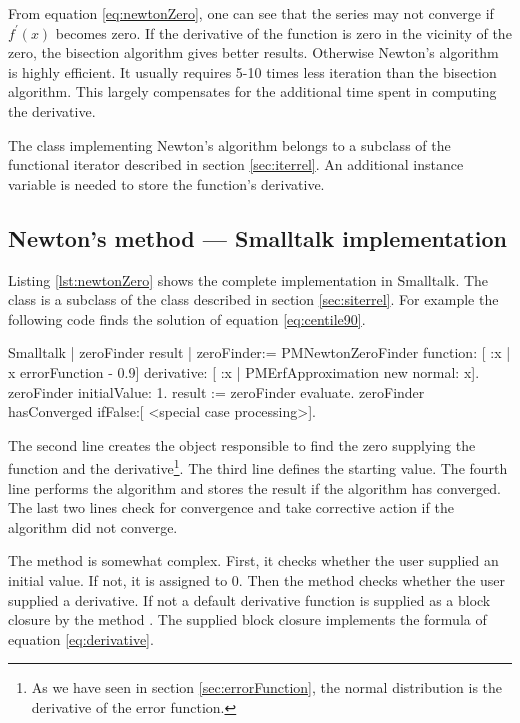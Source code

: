 From equation \ref{eq:newtonZero}, one can see that the series may
not converge if $f^{\prime}\left(x\right)$ becomes zero. If the
derivative of the function is zero in the vicinity of the zero,
the bisection algorithm gives better results. Otherwise Newton's
algorithm is highly efficient. It usually requires 5-10 times less
iteration than the bisection algorithm. This largely compensates
for the additional time spent in computing the derivative.

The class implementing Newton's algorithm belongs to a subclass of
the functional iterator described in section \ref{sec:iterrel}. An
additional instance variable is needed to store the function's
derivative.

\subsection{Newton's method --- Smalltalk implementation}
\label{sec:snewton} Listing \ref{lst:newtonZero} shows the complete
implementation in Smalltalk. The class 
is a subclass of the class  described
in section \ref{sec:siterrel}. For example the following code
finds the solution of equation \ref{eq:centile90}.

\begin{displaycode}{Smalltalk}
| zeroFinder result |
zeroFinder:= PMNewtonZeroFinder
            function: [ :x | x errorFunction - 0.9]
            derivative: [ :x | PMErfApproximation new normal: x].
zeroFinder initialValue: 1.
result := zeroFinder evaluate.
zeroFinder hasConverged
   ifFalse:[ <special case processing>].
\end{displaycode}
The second line creates the object responsible to find the zero
supplying the function and the derivative\footnote{As we have seen
in section \ref{sec:errorFunction}, the normal distribution is the
derivative of the error function.}. The third line defines the
starting value. The fourth line performs the algorithm and stores
the result if the algorithm has converged. The last two lines
check for convergence and take corrective action if the algorithm
did not converge.

The method  is somewhat complex. First,
it checks whether the user supplied an initial value. If not, it
is assigned to 0. Then the method checks whether the user supplied
a derivative. If not a default derivative function is supplied as
a block closure by the method . The
supplied block closure implements the formula of equation
\ref{eq:derivative}.

